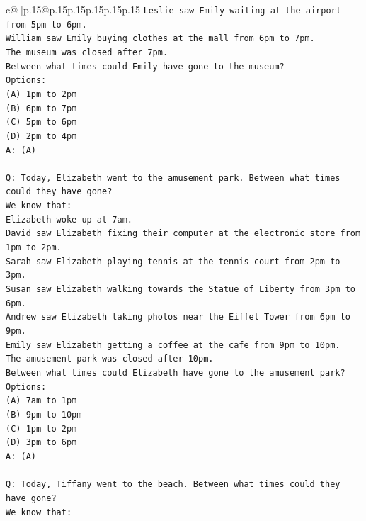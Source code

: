 \documentclass{article}
\begin{document}
{\begin{supertabular}{c@{$\;$}|p{.15\linewidth}@{}p{.15\linewidth}p{.15\linewidth}p{.15\linewidth}p{.15\linewidth}p{.15\linewidth}}
{{{\texttt{Leslie saw Emily waiting at the airport from 5pm to 6pm.} \\
\texttt{William saw Emily buying clothes at the mall from 6pm to 7pm.} \\
\texttt{The museum was closed after 7pm.} \\
\texttt{Between what times could Emily have gone to the museum?} \\
\texttt{Options:} \\
\texttt{(A) 1pm to 2pm} \\
\texttt{(B) 6pm to 7pm} \\
\texttt{(C) 5pm to 6pm} \\
\texttt{(D) 2pm to 4pm} \\
\texttt{A: (A)} \\
\\ 
\texttt{Q: Today, Elizabeth went to the amusement park. Between what times could they have gone?} \\
\texttt{We know that:} \\
\texttt{Elizabeth woke up at 7am.} \\
\texttt{David saw Elizabeth fixing their computer at the electronic store from 1pm to 2pm.} \\
\texttt{Sarah saw Elizabeth playing tennis at the tennis court from 2pm to 3pm.} \\
\texttt{Susan saw Elizabeth walking towards the Statue of Liberty from 3pm to 6pm.} \\
\texttt{Andrew saw Elizabeth taking photos near the Eiffel Tower from 6pm to 9pm.} \\
\texttt{Emily saw Elizabeth getting a coffee at the cafe from 9pm to 10pm.} \\
\texttt{The amusement park was closed after 10pm.} \\
\texttt{Between what times could Elizabeth have gone to the amusement park?} \\
\texttt{Options:} \\
\texttt{(A) 7am to 1pm} \\
\texttt{(B) 9pm to 10pm} \\
\texttt{(C) 1pm to 2pm} \\
\texttt{(D) 3pm to 6pm} \\
\texttt{A: (A)} \\
\\ 
\texttt{Q: Today, Tiffany went to the beach. Between what times could they have gone?} \\
\texttt{We know that:} \\
}}}
\end{supertabular}}
\end{document}
